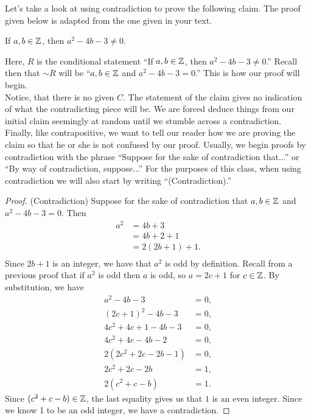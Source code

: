 \vspace{.5in}

\noindent  Let's take a look at using contradiction to prove the following claim.  The proof given below is adapted from the one given in your text.

\begin{claim} If $a,b \in \mathbb{Z}$, then $a^2-4b-3 \neq 0$.
\end{claim}

Here, $R$ is the conditional statement ``If $a,b \in \mathbb{Z}$, then $a^2-4b-3 \neq 0$.''  Recall then that $\sim R$ will be ``$a, b \in \mathbb{Z}$ and $a^2-4b-3=0$.''  This is how our proof will begin.\\

Notice, that there is no given $C$.  The statement of the claim gives no indication of what the contradicting piece will be.  We are forced deduce things from our initial claim seemingly at random until we stumble across a contradiction.\\

Finally, like contrapositive, we want to tell our reader how we are proving the claim so that he or she is not confused by our proof.  Usually, we begin proofs by contradiction with the phrase ``Suppose for the sake of contradiction that...'' or ``By way of contradiction, suppose...''  For the purposes of this class, when using contradiction we will also start by writing ``(Contradiction).''\\

\begin{proof}  (Contradiction) Suppose for the sake of contradiction that $a,b \in \mathbb{Z}$ and ${a^2-4b-3 = 0}$.  Then 
\begin{align*}
a^2 &= 4b+3\\
\ &=4b+2+1\\
\ &=2(2b+1)+1.\\
\end{align*}
  Since $2b+1$ is an integer, we have that $a^2$ is odd by definition.  Recall from a previous proof that if $a^2$ is odd then $a$ is odd, so $a=2c+1$ for $c \in \mathbb{Z}$.  By substitution, we have
	\begin{align*}
	a^2-4b-3 &= 0,\\
	(2c+1)^2-4b-3 &= 0, \\
	4c^2+4c+1 -4b-3 &= 0,\\
	4c^2+4c-4b-2 &= 0,\\
	2(2c^2+2c-2b-1) &=0, \\
	2c^2 +2c -2b &= 1, \\
	2(c^2+c-b) &= 1.
	\end{align*}
Since $(c^2+c-b) \in \mathbb{Z}$, the last equality gives us that $1$ is an even integer.  Since we know 1 to be an odd integer, we have a contradiction.
\end{proof}

